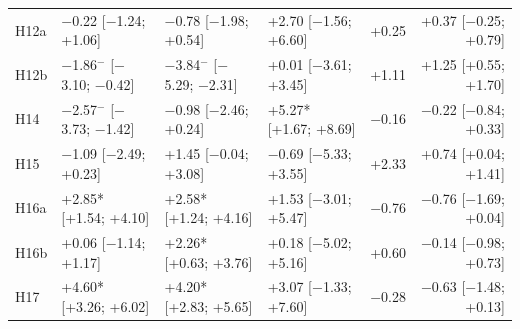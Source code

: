 \begin{table}[H]
\begin{tabular}{@{}l lll rr@{}}
H12a & $-$0.22 [$-$1.24; +1.06] & $-$0.78 [$-$1.98; +0.54] & +2.70 [$-$1.56; +6.60] & +0.25 & +0.37 [$-$0.25; +0.79] \\
H12b & $-$1.86$^-$ [$-$3.10; $-$0.42] & $-$3.84$^-$ [$-$5.29; $-$2.31] & +0.01 [$-$3.61; +3.45] & +1.11 & +1.25 [+0.55; +1.70] \\
H14 & $-$2.57$^-$ [$-$3.73; $-$1.42] & $-$0.98 [$-$2.46; +0.24] & +5.27* [+1.67; +8.69] & $-$0.16 & $-$0.22 [$-$0.84; +0.33] \\
H15 & $-$1.09 [$-$2.49; +0.23] & +1.45 [$-$0.04; +3.08] & $-$0.69 [$-$5.33; +3.55] & +2.33 & +0.74 [+0.04; +1.41] \\
H16a & +2.85* [+1.54; +4.10] & +2.58* [+1.24; +4.16] & +1.53 [$-$3.01; +5.47] & $-$0.76 & $-$0.76 [$-$1.69; +0.04] \\
H16b & +0.06 [$-$1.14; +1.17] & +2.26* [+0.63; +3.76] & +0.18 [$-$5.02; +5.16] & +0.60 & $-$0.14 [$-$0.98; +0.73] \\
H17 & +4.60* [+3.26; +6.02] & +4.20* [+2.83; +5.65] & +3.07 [$-$1.33; +7.60] & $-$0.28 & $-$0.63 [$-$1.48; +0.13] \\
\bottomrule\end{tabular}\end{table}

